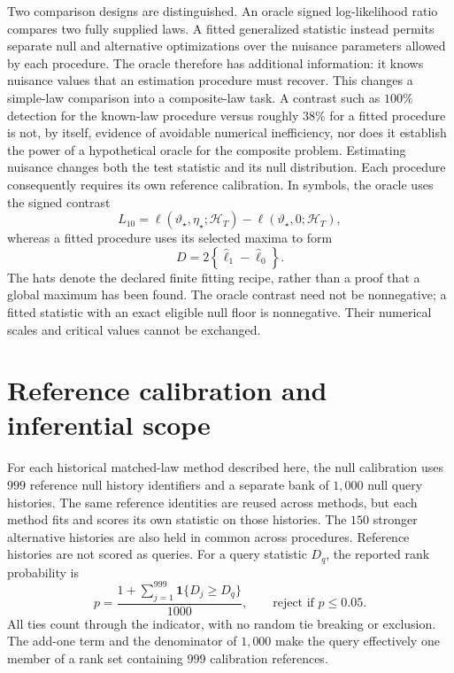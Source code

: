 Two comparison designs are distinguished. An oracle signed log-likelihood ratio compares two fully supplied laws. A fitted generalized statistic instead permits separate null and alternative optimizations over the nuisance parameters allowed by each procedure. The oracle therefore has additional information: it knows nuisance values that an estimation procedure must recover. This changes a simple-law comparison into a composite-law task. A contrast such as \(100\%\) detection for the known-law procedure versus roughly \(38\%\) for a fitted procedure is not, by itself, evidence of avoidable numerical inefficiency, nor does it establish the power of a hypothetical oracle for the composite problem. Estimating nuisance changes both the test statistic and its null distribution. Each procedure consequently requires its own reference calibration. In symbols, the oracle uses the signed contrast
\begin{equation}
 L_{10}=\ell(\vartheta_\star,\eta_\star;\mathcal H_T)
        -\ell(\vartheta_\star,0;\mathcal H_T),
 \label{eq:oracle-statistic}
\end{equation}
whereas a fitted procedure uses its selected maxima to form
\begin{equation}
 D=2\left\{\widehat\ell_1-\widehat\ell_0\right\}.
 \label{eq:fitted-statistic}
\end{equation}
The hats denote the declared finite fitting recipe, rather than a proof that a global maximum has been found. The oracle contrast need not be nonnegative; a fitted statistic with an exact eligible null floor is nonnegative. Their numerical scales and critical values cannot be exchanged.

\section{Reference calibration and inferential scope}

For each historical matched-law method described here, the null calibration uses \(999\) reference null history identifiers and a separate bank of \(1{,}000\) null query histories. The same reference identities are reused across methods, but each method fits and scores its own statistic on those histories. The \(150\) stronger alternative histories are also held in common across procedures. Reference histories are not scored as queries. For a query statistic \(D_q\), the reported rank probability is
\begin{equation}
p=\frac{1+\sum_{j=1}^{999}\mathbf 1\{D_j\ge D_q\}}{1000},
\qquad
\text{reject if }p\le 0.05.
\label{eq:rank-p}
\end{equation}
All ties count through the indicator, with no random tie breaking or exclusion. The add-one term and the denominator of \(1{,}000\) make the query effectively one member of a rank set containing \(999\) calibration references.


